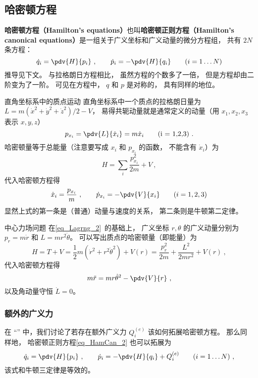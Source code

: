 \subsection{哈密顿方程}
\textbf{哈密顿方程（Hamilton's equations）}也叫\textbf{哈密顿正则方程（Hamilton's canonical equations）}是一组关于广义坐标和广义动量的微分方程组， 共有 $2N$ 条方程：
\begin{equation}\label{eq_HamCan_2}
\dot q_i = \pdv{H}{p_i}~,
\qquad
\dot p_i = -\pdv{H}{q_i}
\qquad
(i = 1\dots N)
\end{equation}
推导见下文。 与拉格朗日方程相比， 虽然方程的个数多了一倍， 但是方程却由二阶变为了一阶。 可见在方程中， $q$ 和 $p$ 是对称的， 具有同样的地位。

\begin{example}{直角坐标系中的质点运动}
直角坐标系中一个质点的拉格朗日量为 $L = m(\dot x^2 + \dot y^2 + \dot z^2)/2 - V$， 易得共轭动量就是通常定义的动量（用 $x_1,x_2,x_3$ 表示 $x, y, z$）
\begin{equation}
p_{x_i} = \pdv{L}{\dot x_i} = m\dot x_i \qquad \text{(i = 1,2,3)}~.
\end{equation}
哈密顿量等于总能量（注意要写成 $x_i$ 和 $p_{x_i}$ 的函数， 不能含有 $\dot x_i$）为
\begin{equation}
H = \sum_i \frac{p_{x_i}^2}{2m} + V~,
\end{equation}
代入哈密顿方程得
\begin{equation}
\dot x_i = \frac{p_{x_i}}{m}~,
\qquad
\dot p_{x_i} = -\pdv{V}{x_i}
\qquad (i = 1,2,3)
\end{equation}
显然上式的第一条是（普通）动量与速度的关系， 第二条则是牛顿第二定律。
\end{example}

\begin{example}{中心力场问题}\label{ex_HamCan_1}
在\autoref{eq_Lagrng_2}~的基础上， 广义坐标 $r, \theta$ 的广义动量分别为 $p_r = m\dot r$ 和 $L = mr^2\dot \theta$。 可以写出质点的哈密顿量（即能量）为
\begin{equation}\label{eq_HamCan_3}
H = T + V = \frac12 m(\dot r^2 + r^2 \dot \theta^2) + V(r) = \frac{p_r^2}{2m} + \frac{L^2}{2mr^2} + V(r)~,
\end{equation}
代入哈密顿方程得
\begin{equation}
m\ddot r = mr \dot \theta^2 - \pdv{V}{r}~,
\end{equation}
以及角动量守恒 $\dot L = 0$。
\end{example}

\subsubsection{额外的广义力}
在 “” 中，我们讨论了若存在额外广义力 $Q_i^{(e)}$ 该如何拓展哈密顿方程。 那么同样地， 哈密顿正则方程\autoref{eq_HamCan_2} 也可以拓展为
\begin{equation}\label{eq_HamCan_5}
\dot q_i = \pdv{H}{p_i}~,
\qquad
\dot p_i = -\pdv{H}{q_i} + Q_i^{(e)}
\qquad
(i = 1\dots N)~,
\end{equation}
该式和牛顿三定律是等效的。


